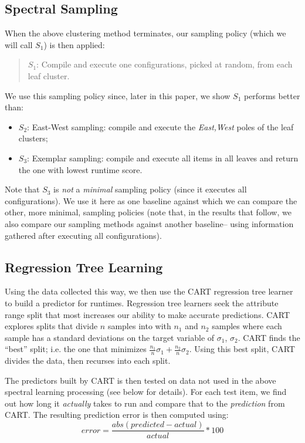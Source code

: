 \documentclass{sig-alternative}
\newcommand{\bi}{\begin{itemize}}%
\newcommand{\ei}{\end{itemize}}
\begin{document}
\subsection{Spectral Sampling}\label{sect:sample}
When the above clustering method terminates, our  sampling policy (which we will call $S_1$) is then applied:
\begin{quote}
$S_1$: Compile and execute one  configurations,  picked at random, from each leaf cluster.
\end{quote}
We use this sampling policy since, later in this paper, we show $S_1$ performs better than:
\bi
\item $S_2$: East-West sampling: compile and execute the {\em East,West} poles of the leaf clusters;
\item $S_3$: Exemplar sampling: compile and execute all items in all leaves and return the one
with lowest runtime score.
\ei
Note that $S_3$ is {\em not} a {\em minimal} sampling policy (since it executes all configurations). 
We use it here as one  baseline
against which we can compare the other, more minimal, sampling policies (note that, in the results
that follow, we also compare our 
sampling methods against another baseline--
using information gathered after executing
all configurations).

\subsection{Regression Tree Learning}
Using the data collected this way, we then use the CART regression tree learner \cite{breiman1984} to build a predictor for runtimes. Regression tree learners seek the attribute range split that most increases
our ability to make accurate predictions.
CART explores splits that divide $n$ samples  into   with $n_1$ and $n_2$ samples where each sample  has a  standard deviations on the target variable of $\sigma_1$, $\sigma_2$.
CART finds the ``best'' split; i.e. the one that minimizes $\frac{n_1}{n}\sigma_1 + \frac{n_2}{n}\sigma_2$.
Using this best split, CART divides the data, then recurses into each split.
 

The predictors built by CART  is then tested on data not used in the above spectral learning processing (see below for details). For each  test item, we find out how long it {\em actually} takes to run and compare that
to the {\em prediction} from CART. The resulting prediction error is then computed using:
\begin{equation}\label{eq:err}
\mathit{error}=\frac{\mathit{abs}(\mathit{predicted} - \mathit{actual})}{\mathit{actual}}*100
\end{equation}
\end{document}
